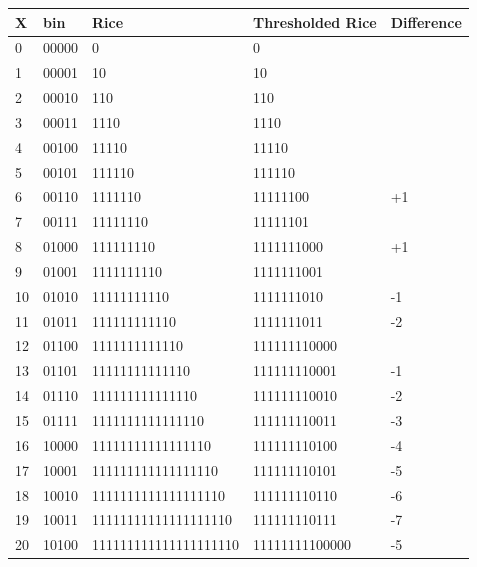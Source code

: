 \documentclass[a4paper,11pt,oneside]{report}
\begin{document}
\begin{enumerate}
\begin{tabular}{|l|l|l|l|l|}\hline
\textbf{X} & \textbf{bin} & \textbf{Rice} & \textbf{Thresholded Rice} & \textbf{Difference}\\\hline
  0 & 00000 &   0                     & 0              & \\\hline
  1 & 00001 &   10                    & 10             & \\\hline
  2 & 00010 &   110                   & 110            & \\\hline
  3 & 00011 &   1110                  & 1110           & \\\hline
  4 & 00100 &   11110                 & 11110          & \\\hline
  5 & 00101 &   111110                & 111110         & \\\hline
  6 & 00110 &   1111110               & 11111100       &       +1 \\\hline
  7 & 00111 &   11111110              & 11111101       & \\\hline
  8 & 01000 &   111111110             & 1111111000     &       +1 \\\hline
  9 & 01001 &   1111111110            & 1111111001     & \\\hline
 10 & 01010 &   11111111110           & 1111111010     &       -1 \\\hline
 11 & 01011 &   111111111110          & 1111111011     &       -2 \\\hline
 12 & 01100 &   1111111111110         & 111111110000   & \\\hline
 13 & 01101 &   11111111111110        & 111111110001   &       -1 \\\hline
 14 & 01110 &   111111111111110       & 111111110010   &       -2 \\\hline
 15 & 01111 &   1111111111111110      & 111111110011   &       -3 \\\hline
 16 & 10000 &   11111111111111110     & 111111110100   &       -4 \\\hline
 17 & 10001 &   111111111111111110    & 111111110101   &       -5 \\\hline
 18 & 10010 &   1111111111111111110   & 111111110110   &       -6 \\\hline
 19 & 10011 &   11111111111111111110  & 111111110111   &       -7 \\\hline
 20 & 10100 &   111111111111111111110 & 11111111100000 &       -5 \\\hline
\end{tabular}


\end{enumerate}
\end{document}

